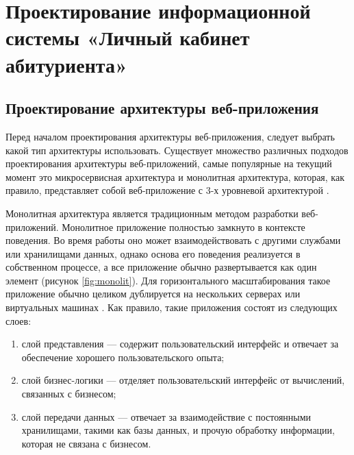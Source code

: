 \chapter{Проектирование информационной системы «Личный кабинет абитуриента»}

\section{Проектирование архитектуры веб-приложения}

Перед началом проектирования архитектуры веб-приложения, следует выбрать какой тип архитектуры использовать. Существует множество различных подходов проектирования архитектуры веб-приложений, самые популярные на текущий момент это микросервисная архитектура и монолитная архитектура, которая, как правило, представляет собой веб-приложение с 3-х уровневой архитектурой \cite{webapacrch}.

Монолитная архитектура является традиционным методом разработки веб-приложений. Монолитное приложение полностью замкнуто в контексте поведения. Во время работы оно может взаимодействовать с другими службами или хранилищами данных, однако основа его поведения реализуется в собственном процессе, а все приложение обычно развертывается как один элемент (рисунок \ref{fig:monolit}). Для горизонтального масштабирования такое приложение обычно целиком дублируется на нескольких серверах или виртуальных машинах \cite{monolith}. Как правило, такие приложения состоят из следующих слоев:

\begin{enumerate} 
  \item слой представления — содержит пользовательский интерфейс и отвечает за обеспечение хорошего пользовательского опыта;
  
  \item слой бизнес-логики — отделяет пользовательский интерфейс от вычислений, связанных с бизнесом;
  
  \item слой передачи данных — отвечает за взаимодействие с постоянными хранилищами, такими как базы данных, и прочую обработку информации, которая не связана с бизнесом.
\end{enumerate}

